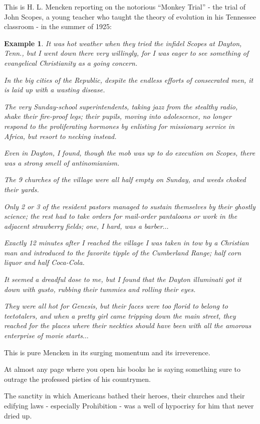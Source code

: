 \documentclass{book}
\numberwithin{equation}{section}
\newtheorem{example}{Example}[chapter]
\begin{document}
This is H. L. Mencken reporting on the notorious ``Monkey Trial'' - the trial of John Scopes, a young teacher who taught the theory of evolution in his Tennessee classroom - in the summer of 1925:
\begin{example}
    It was hot weather when they tried the infidel Scopes at Dayton, Tenn., but I went down there very willingly, for I was eager to see something of evangelical Christianity as a going concern.
    
    In the big cities of the Republic, despite the endless efforts of consecrated men, it is laid up with a wasting disease.
    
    The very Sunday-school superintendents, taking jazz from the stealthy radio, shake their fire-proof legs; their pupils, moving into adolescence, no longer respond to the proliferating hormones by enlisting for missionary service in Africa, but resort to necking instead.
    
    Even in Dayton, I found, though the mob was up to do execution on Scopes, there was a strong smell of antinomianism.
    
    The 9 churches of the village were all half empty on Sunday, and weeds choked their yards.
    
    Only 2 or 3 of the resident pastors managed to sustain themselves by their ghostly science; the rest had to take orders for mail-order pantaloons or work in the adjacent strawberry fields; one, I hard, was a barber$\ldots$
    
    Exactly 12 minutes after I reached the village I was taken in tow by a Christian man and introduced to the favorite tipple of the Cumberland Range; half corn liquor and half Coca-Cola.
    
    It seemed a dreadful dose to me, but I found that the Dayton illuminati got it down with gusto, rubbing their tummies and rolling their eyes.
    
    They were all hot for Genesis, but their faces were too florid to belong to teetotalers, and when a pretty girl came tripping down the main street, they reached for the places where their neckties should have been with all the amorous enterprise of movie starts$\ldots$
\end{example}
This is pure Mencken in its surging momentum and its irreverence.

At almost any page where you open his books he is saying something sure to outrage the professed pieties of his countrymen.

The sanctity in which Americans bathed their heroes, their churches and their edifying laws - especially Prohibition - was a well of hypocrisy for him that never dried up.
\end{document}
